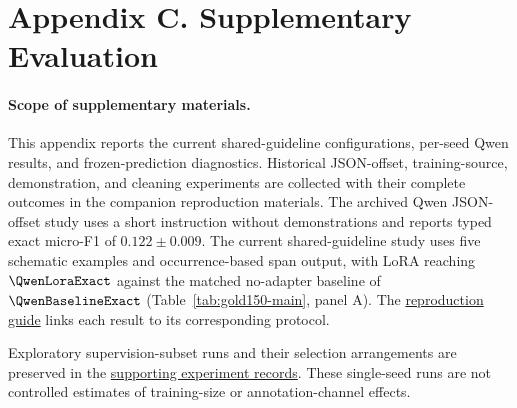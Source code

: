 \section{Appendix C. Supplementary Evaluation}
\label{app:c}
\paragraph{Scope of supplementary materials.}
This appendix reports the current shared-guideline configurations, per-seed Qwen results, and frozen-prediction diagnostics. Historical JSON-offset, training-source, demonstration, and cleaning experiments are collected with their complete outcomes in the companion reproduction materials. The archived Qwen JSON-offset study uses a short instruction without demonstrations and reports typed exact micro-F1 of $0.122\pm0.009$. The current shared-guideline study uses five schematic examples and occurrence-based span output, with LoRA reaching $\QwenLoraExact$ against the matched no-adapter baseline of $\QwenBaselineExact$ (Table~\ref{tab:gold150-main}, panel A). The \href{https://github.com/AlfredJamesLi/chinese-skillspan-benchmark/blob/main/REPRODUCIBILITY.md}{reproduction guide} links each result to its corresponding protocol.


\FloatBarrier

\FloatBarrier

Exploratory supervision-subset runs and their selection arrangements are preserved in the \href{https://github.com/AlfredJamesLi/chinese-skillspan-benchmark/blob/36f009fab01b8433355cb7ef5af8fad02c6cc519/reproduction/process_archive_20260924/README.md}{supporting experiment records}. These single-seed runs are not controlled estimates of training-size or annotation-channel effects.
